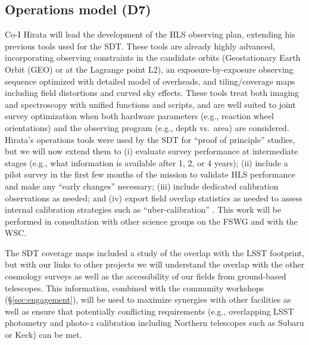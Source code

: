\subsection{Operations model (D7)}

Co-I Hirata will lead the development of the HLS observing plan, 
extending his previous tools used for the SDT. These tools are already 
highly advanced, incorporating observing constraints in the candidate 
orbits (Geostationary Earth Orbit (GEO) or at the Lagrange point L2),
an exposure-by-exposure observing sequence optimized  
with detailed model of overheads, and tiling/coverage maps including 
field distortions and curved sky effects. These tools treat both imaging 
and spectroscopy with unified functions and scripts, and are well suited to joint survey optimization when 
both hardware parameters (e.g., reaction wheel orientations) and the 
observing program (e.g., depth vs.\ area) are considered.
Hirata's operations tools were 
used by the SDT for ``proof of principle'' studies, but we will now 
extend them to (i) evaluate survey performance at intermediate stages 
(e.g., what information is available after 1, 2, or 4 years); (ii) 
include a pilot survey in the first few months of the mission to 
validate HLS performance and make any ``early changes'' necessary;
(iii) include dedicated calibration observations as needed; and (iv)
export field overlap statistics as needed to assess internal calibration
strategies such as ``uber-calibration'' \cite{Padmanabhan2008}. This work will
be performed in consultation with other science groups on the FSWG and with
the WSC.

The SDT coverage maps included a study of the overlap with the LSST footprint,
but with our links to other projects we will understand the overlap with
the other cosmology surveys as well as the accessibility
of our fields from ground-based telescopes. This information, combined with the
community workshops (\S\ref{sec:engagement}), will be used to maximize synergies with
other facilities as well as ensure that potentially conflicting requirements (e.g.,
overlapping LSST photometry and photo-$z$ calibration including Northern telescopes
such as Subaru or Keck) can be met.



